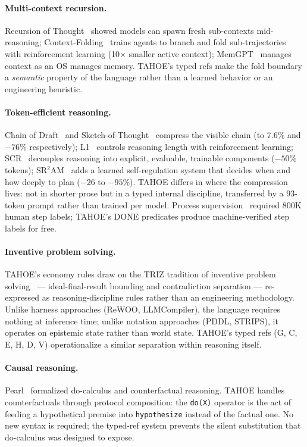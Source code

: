 \documentclass[11pt,a4paper]{article}
\begin{document}
\paragraph{Multi-context recursion.}
Recursion of Thought~\cite{lee2023rot} showed models can spawn fresh sub-contexts mid-reasoning; Context-Folding~\cite{sun2025folding} trains agents to branch and fold sub-trajectories with reinforcement learning (10$\times$ smaller active context); MemGPT~\cite{wang2024memgpt} manages context as an OS manages memory. TAHOE's typed refs make the fold boundary a \emph{semantic} property of the language rather than a learned behavior or an engineering heuristic.

\paragraph{Token-efficient reasoning.}
Chain of Draft~\cite{xu2025cod} and Sketch-of-Thought~\cite{lee2025sketch} compress the visible chain (to 7.6\% and $-76\%$ respectively); L1~\cite{aggarwal2025l1} controls reasoning length with reinforcement learning; SCR~\cite{han2026scr} decouples reasoning into explicit, evaluable, trainable components ($-50\%$ tokens); SR$^2$AM~\cite{deng2026sr2am} adds a learned self-regulation system that decides when and how deeply to plan ($-26$ to $-95\%$). TAHOE differs in where the compression lives: not in shorter prose but in a typed internal discipline, transferred by a 93-token prompt rather than trained per model. Process supervision~\cite{lightman2023verify} required 800K human step labels; TAHOE's DONE predicates produce machine-verified step labels for free.

\paragraph{Inventive problem solving.}
TAHOE's economy rules draw on the TRIZ tradition of inventive problem solving~\cite{altshuller1984creativity} --- ideal-final-result bounding and contradiction separation --- re-expressed as reasoning-discipline rules rather than an engineering methodology. Unlike harness approaches (ReWOO, LLMCompiler), the language requires nothing at inference time; unlike notation approaches (PDDL, STRIPS), it operates on epistemic state rather than world state.
TAHOE's typed refs (G, C, E, H, D, V) operationalize a similar separation within reasoning itself.

\paragraph{Causal reasoning.}
Pearl~\cite{pearl2009causality} formalized do-calculus and counterfactual reasoning.
TAHOE handles counterfactuals through protocol composition: the \texttt{do(X)} operator is the act of feeding a hypothetical premise into \texttt{hypothesize} instead of the factual one.
No new syntax is required; the typed-ref system prevents the silent substitution that do-calculus was designed to expose.
\end{document}

